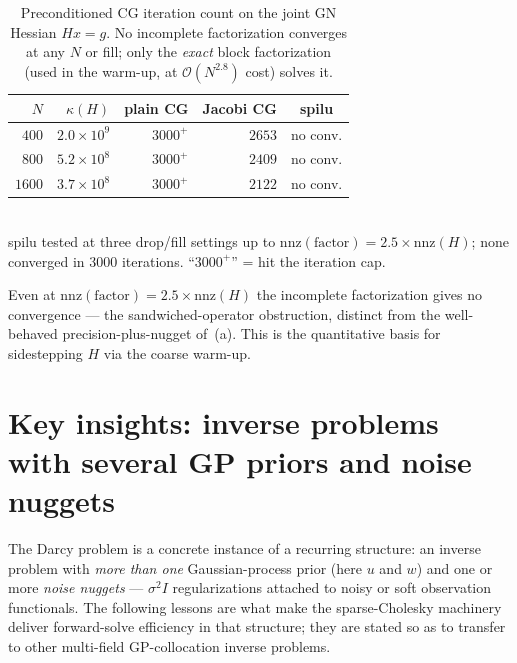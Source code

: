 \documentclass[11pt]{article}
\newcommand{\bigO}{\mathcal{O}}
\begin{document}
\begin{table}[h]
\centering
\caption{Preconditioned CG iteration count on the joint GN Hessian $Hx=g$. No
incomplete factorization converges at any $N$ or fill; only the \emph{exact}
block factorization (used in the warm-up, at $\bigO(N^{2.8})$ cost) solves it.}
\label{tab:Hfail}
\begin{tabular}{rrrrc}
\toprule
$N$ & $\kappa(H)$ & plain CG & Jacobi CG & spilu \\
\midrule
$400$  & $2.0\times10^{9}$ & $3000^{+}$ & $2653$ & no conv. \\
$800$  & $5.2\times10^{8}$ & $3000^{+}$ & $2409$ & no conv. \\
$1600$ & $3.7\times10^{8}$ & $3000^{+}$ & $2122$ & no conv. \\
\bottomrule
\end{tabular}\\[2pt]
{\footnotesize spilu tested at three drop/fill settings up to
$\mathrm{nnz}(\text{factor})=2.5\times\mathrm{nnz}(H)$; none converged in $3000$
iterations. ``$3000^{+}$'' = hit the iteration cap.}
\end{table}

\noindent Even at $\mathrm{nnz}(\text{factor})=2.5\times\mathrm{nnz}(H)$ the
incomplete factorization gives no convergence --- the sandwiched-operator
obstruction, distinct from the well-behaved precision-plus-nugget of~(a). This is
the quantitative basis for sidestepping $H$ via the coarse warm-up.

\section{Key insights: inverse problems with several GP priors and noise
nuggets}\label{sec:insights}

The Darcy problem is a concrete instance of a recurring structure: an inverse
problem with \emph{more than one} Gaussian-process prior (here $u$ and $w$) and
one or more \emph{noise nuggets} --- $\sigma^2 I$ regularizations attached to
noisy or soft observation functionals. The following lessons are what make the
sparse-Cholesky machinery deliver forward-solve efficiency in that structure;
they are stated so as to transfer to other multi-field GP-collocation inverse
problems.
\end{document}
